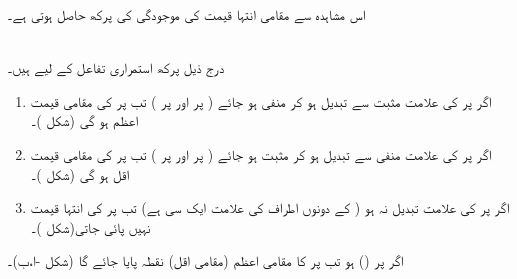 اس مشاہدہ سے مقامی انتہا قیمت کی موجودگی کی   پرکھ  حاصل ہوتی ہے۔

\\
درج ذیل پرکھ استمراری تفاعل  کے لیے ہیں۔

\begin{enumerate}
\item
اگر  پر  کی علامت مثبت سے تبدیل ہو کر منفی ہو جائے ( پر  اور  پر ) تب  پر  کی مقامی   قیمت  اعظم ہو گی (شکل )۔ 
\item
اگر  پر  کی علامت منفی سے تبدیل ہو کر مثبت ہو جائے ( پر  اور  پر ) تب  پر  کی مقامی قیمت  اقل   ہو گی (شکل )۔ 
\item
اگر  پر  کی علامت تبدیل نہ ہو ( کے دونوں اطراف  کی علامت ایک سی ہے) تب  پر  کی  انتہا قیمت نہیں پائی جاتی(شکل )۔
\end{enumerate}

اگر  پر  () ہو تب  پر  کا مقامی اعظم (مقامی اقل) نقطہ پایا جائے گا (شکل -ا،ب)۔ 



